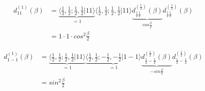 \begin{align}
  d_{11}^{(1)}(\beta)&= \underbrace{\langle \frac{1}{2},\frac{1}{2};\frac{1}{2},\frac{1}{2}|11\rangle}_{=1} \langle  \frac{1}{2},\frac{1}{2};\frac{1}{2},\frac{1}{2}|11\rangle \underbrace{d_{\frac{1}{2}\frac{1}{2}}^{(\frac{1}{2})}(\beta)}_{cos\frac{\beta}{2}}d_{\frac{1}{2}\frac{1}{2}}^{(\frac{1}{2})}(\beta)\\
&= 1\cdot 1\cdot cos^2\frac{\beta}{2}
\end{align}


\begin{align}
d_{1-1}^{(1)}(\beta)&=\underbrace{\langle \frac{1}{2},\frac{1}{2};\frac{1}{2},\frac{1}{2}|11\rangle}_{=1}\underbrace{ \langle  \frac{1}{2},\frac{1}{2};-\frac{1}{2},-\frac{1}{2}|1-1\rangle}_{=1} \underbrace{d_{\frac{1}{2}-\frac{1}{2}}^{(\frac{1}{2})}(\beta)}_{-sin\frac{\beta}{2}}d_{\frac{1}{2}-\frac{1}{2}}^{(\frac{1}{2})}(\beta)\\
&= sin^2\frac{\beta}{2}
\end{align}








